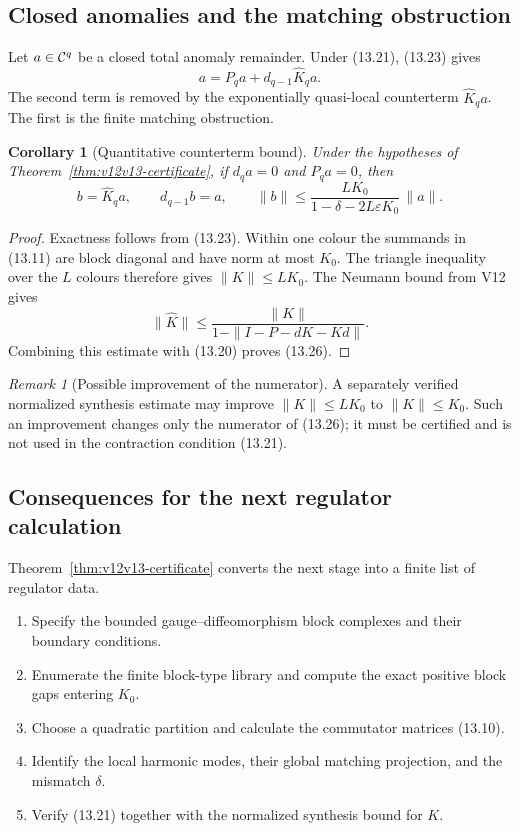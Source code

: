 \documentclass[11pt]{article}
\newtheorem{corollary}[theorem]{Corollary}
\theoremstyle{remark}
\newtheorem{remark}[theorem]{Remark}
\begin{document}
\subsection{Closed anomalies and the matching obstruction}

Let \(a\in{\cal C}^q\) be a closed total anomaly remainder.  Under
(13.21), (13.23) gives
\[
                    a=P_qa+d_{q-1}\widehat K_qa.            \tag{13.25}
\]
The second term is removed by the exponentially quasi-local
counterterm \(\widehat K_qa\).  The first is the finite matching
obstruction.

\begin{corollary}[Quantitative counterterm bound]
\label{cor:v12v13-counterterm}
Under the hypotheses of
Theorem~\ref{thm:v12v13-certificate}, if \(d_qa=0\) and \(P_qa=0\),
then
\[
 b=\widehat K_qa,\qquad d_{q-1}b=a,\qquad
 \|b\|\le
 \frac{LK_0}{1-\delta-2L\varepsilon K_0}\,\|a\|.            \tag{13.26}
\]
\end{corollary}

\begin{proof}
Exactness follows from (13.23).  Within one colour the summands in
(13.11) are block diagonal and have norm at most \(K_0\).  The
triangle inequality over the \(L\) colours therefore gives
\(\|K\|\le LK_0\).  The Neumann bound from V12 gives
\[
 \|\widehat K\|
 \le\frac{\|K\|}
          {1-\|I-P-dK-Kd\|}.
\]
Combining this estimate with (13.20) proves (13.26).
\end{proof}

\begin{remark}[Possible improvement of the numerator]
\label{rem:v12v13-numerator}
A separately verified normalized synthesis estimate may improve
\(\|K\|\le LK_0\) to \(\|K\|\le K_0\).  Such an improvement changes
only the numerator of (13.26); it must be certified and is not used
in the contraction condition (13.21).
\end{remark}

\subsection{Consequences for the next regulator calculation}

Theorem~\ref{thm:v12v13-certificate} converts the next stage into a
finite list of regulator data.

\begin{enumerate}
\item Specify the bounded gauge--diffeomorphism block complexes and
      their boundary conditions.
\item Enumerate the finite block-type library and compute the exact
      positive block gaps entering \(K_0\).
\item Choose a quadratic partition and calculate the commutator
      matrices (13.10).
\item Identify the local harmonic modes, their global matching
      projection, and the mismatch \(\delta\).
\item Verify (13.21) together with the normalized synthesis bound for
      \(K\).
\end{enumerate}
\end{document}
